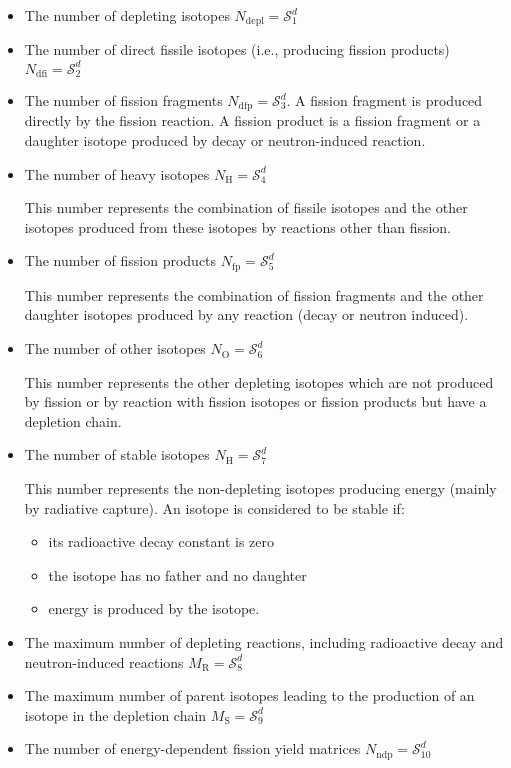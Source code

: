 \begin{itemize}
\item The number of depleting isotopes $N_{\mathrm{depl}}=\mathcal{S}^{d}_{1}$
\item The number of direct fissile isotopes (i.e., producing fission products) $N_{\mathrm{dfi}}=\mathcal{S}^{d}_{2}$
\item The number of fission fragments $N_{\mathrm{dfp}}=\mathcal{S}^{d}_{3}$. A fission fragment is produced directly by the
fission reaction. A fission product is a fission fragment or a daughter isotope
produced by decay or neutron-induced reaction.
\item The number of heavy isotopes $N_{\mathrm{H}}=\mathcal{S}^{d}_{4}$ 

This number represents the combination of fissile isotopes and the other isotopes produced from
these isotopes by reactions other than fission.

\item The number of fission products $N_{\mathrm{fp}}=\mathcal{S}^{d}_{5}$ 

This number represents the combination of fission fragments and the other
daughter isotopes produced by any reaction (decay or neutron induced).

\item The number of other isotopes $N_{\mathrm{O}}=\mathcal{S}^{d}_{6}$ 

This number represents the other depleting isotopes which are not produced by fission or by reaction
with fission isotopes or fission products but have a depletion chain.

\item The number of stable isotopes $N_{\mathrm{H}}=\mathcal{S}^{d}_{7}$ 

This number represents the non-depleting isotopes producing energy (mainly
by radiative capture). An isotope is considered to be stable if:
\begin{itemize}
\item its radioactive decay constant is zero
\item the isotope has no father and no daughter
\item energy is produced by the isotope.
\end{itemize}

\item The maximum number of depleting reactions, including radioactive decay and
neutron-induced reactions $M_{\mathrm{R}}=\mathcal{S}^{d}_{8}$ 

\item The maximum number of parent isotopes leading to the production of an isotope in the
depletion chain $M_{\mathrm{S}}=\mathcal{S}^{d}_{9}$ 

\item The number of energy-dependent fission yield matrices $N_{\mathrm{ndp}}=\mathcal{S}^{d}_{10}$ 

\end{itemize}

